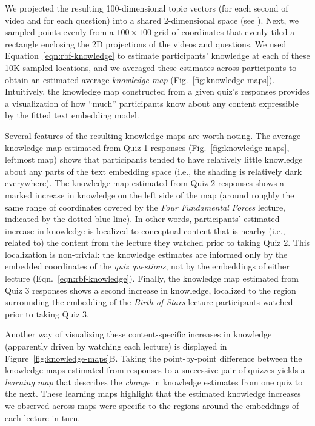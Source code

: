 \documentclass[10pt]{article}
\renewcommand{\nameref}[1]{\mbox{\textit{\oldnameref{#1}}}}
\begin{document}
We projected the resulting 100-dimensional topic vectors (for each second of
video and for each question) into a shared 2-dimensional space (see
\nameref{subsec:knowledge-maps}). Next, we sampled
points evenly from a $100 \times 100$ grid of coordinates that evenly tiled a
rectangle enclosing the 2D projections of the videos and questions. We used
Equation~\ref{eqn:rbf-knowledge} to estimate participants' knowledge at each of
these 10K sampled locations, and we averaged these estimates across
participants to obtain an estimated average \textit{knowledge map}
(Fig.~\ref{fig:knowledge-maps}). Intuitively, the knowledge map constructed
from a given quiz's responses provides a visualization of how ``much''
participants know about any content expressible by the fitted text embedding
model.

Several features of the resulting knowledge maps are worth noting. The average
knowledge map estimated from Quiz 1 responses (Fig.~\ref{fig:knowledge-maps},
leftmost map) shows that participants tended to have relatively little
knowledge about any parts of the text embedding space (i.e., the shading is
relatively dark everywhere). The knowledge map estimated from Quiz 2 responses
shows a marked increase in knowledge on the left side of the map (around
roughly the same range of coordinates covered by the \textit{Four Fundamental
Forces} lecture, indicated by the dotted blue line). In other words,
participants' estimated increase in knowledge is localized to conceptual
content that is nearby (i.e., related to) the content from the lecture they
watched prior to taking Quiz 2. This localization is non-trivial: the knowledge
estimates are informed only by the embedded coordinates of the \textit{quiz
questions}, not by the embeddings of either lecture
(Eqn.~\ref{eqn:rbf-knowledge}). Finally, the knowledge map estimated from Quiz
3 responses shows a second increase in knowledge, localized to the region
surrounding the embedding of the \textit{Birth of Stars} lecture participants
watched prior to taking Quiz 3.

Another way of visualizing these content-specific increases in knowledge
(apparently driven by watching each lecture) is displayed in
Figure~\ref{fig:knowledge-maps}B. Taking the point-by-point difference between
the knowledge maps estimated from responses to a successive pair of quizzes
yields a \textit{learning map} that describes the \textit{change} in knowledge
estimates from one quiz to the next. These learning maps highlight that the
estimated knowledge increases we observed across maps were specific to the
regions around the embeddings of each lecture in turn.
\end{document}
